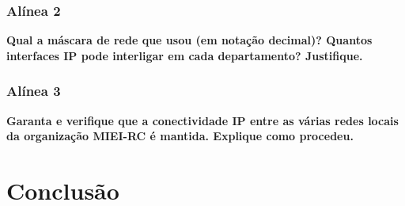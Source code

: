 \documentclass[a4paper]{report}
\begin{document}
\subsection{Alínea 2}
\textbf{Qual a máscara de rede que usou (em notação decimal)? Quantos interfaces IP pode 
interligar em cada departamento? Justifique.}

\subsection{Alínea 3}
\textbf{Garanta e verifique que a conectividade IP entre as várias redes locais da 
organização MIEI-RC é mantida. Explique como procedeu.}

\chapter{Conclusão}
\end{document}
